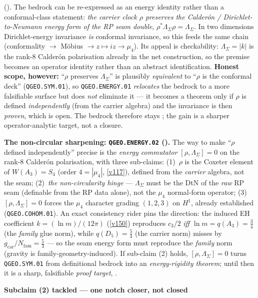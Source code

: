 \documentclass[11pt,a4paper]{article}
\newcommand{\Nfam}{N_{\mathrm{fam}}}
\begin{document}
\begin{keybox}
{().} The bedrock can be re-expressed as an energy identity rather than a
conformal-class statement: \emph{the carrier clock $\rho$ preserves the Calder\'on / Dirichlet-to-Neumann
energy form of the RP seam double}, $\rho^*\Lambda_\Sigma\rho=\Lambda_\Sigma$. In two dimensions
Dirichlet-energy invariance \emph{is} conformal invariance, so this feeds the same chain
(conformality $\to$ M\"obius $\to z\mapsto iz\to\mu_4$). Its appeal is checkability: $\Lambda_\Sigma=|k|$
is the rank-$8$ Calder\'on polarisation already in the net construction, so the premise becomes an operator
identity rather than an abstract identification. \textbf{Honest scope, however:} ``$\rho$ preserves
$\Lambda_\Sigma$'' is plausibly \emph{equivalent} to ``$\rho$ is the conformal deck'' (\texttt{QGEO.SYM.01}),
so \texttt{QGEO.ENERGY.01} \emph{relocates} the bedrock to a more falsifiable surface but does \emph{not}
eliminate it --- it becomes a theorem only if $\rho$ is defined \emph{independently} (from the carrier
algebra) and the invariance is then \emph{proven}, which is open. The bedrock therefore stays \mO; the gain
is a sharper operator-analytic target, not a closure.
\par\smallskip\noindent\textbf{The non-circular sharpening: \texttt{QGEO.ENERGY.02}
().} The way to make ``$\rho$ defined independently'' precise is the
\emph{energy commutator} $[\rho,\Lambda_\Sigma]=0$ on the rank-$8$ Calder\'on polarisation, with three
sub-claims: (1)~$\rho$ is the Coxeter element of $W(A_3)=S_4$ (order $4=|\mu_4|$, \vref{v117}), defined from
the \emph{carrier} algebra, not the seam; (2)~\emph{the non-circularity hinge} --- $\Lambda_\Sigma$ must be
the DtN of the \emph{raw} RP seam (definable from the RP data alone), not the $\mu_4$ normal-form operator;
(3)~$[\rho,\Lambda_\Sigma]=0$ forces the $\mu_4$ character grading $(1,2,3)$ on $H^1$, already established
(\texttt{QGEO.COHOM.01}). An exact consistency rider pins the direction: the induced EH coefficient
$k=(\ln m)/(12\pi)$ (\vref{v150}) reproduces $c_3/2$ \emph{iff} $\ln m=q(A_3)=\tfrac34$ (the \emph{family}
glue norm), while $q(D_5)=\tfrac54$ (the carrier norm) misses by $g_{\mathrm{car}}/\Nfam=\tfrac53$ --- so
the seam energy form must reproduce the \emph{family} norm (gravity is family-geometry-induced). If
sub-claim (2) holds, $[\rho,\Lambda_\Sigma]=0$ turns \texttt{QGEO.SYM.01} from definitional bedrock into an
\emph{energy-rigidity theorem}; until then it is a sharp, falsifiable \emph{proof target}, \mO.
\par\smallskip\noindent\textbf{Subclaim (2) tackled --- one notch closer, not closed
}
\end{keybox}
\end{document}
